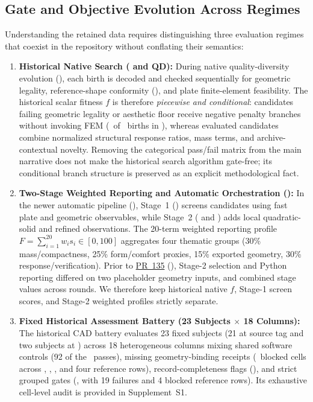 \subsection{Gate and Objective Evolution Across Regimes}
\label{subsec:gate-evolution}
Understanding the retained data requires distinguishing three evaluation regimes that coexist in the repository without conflating their semantics:
\begin{enumerate}
  \item \textbf{Historical Native Search ( and  QD):} During native quality-diversity evolution (), each birth is decoded and checked sequentially for geometric legality, reference-shape conformity (), and plate finite-element feasibility. The historical scalar fitness $f$ is therefore \emph{piecewise and conditional}: candidates failing geometric legality or aesthetic floor receive negative penalty branches without invoking FEM (\FemNotEvaluated\ of \BirthCount\ births in ), whereas evaluated candidates combine normalized structural response ratios, mass terms, and archive-contextual novelty. Removing the categorical pass/fail matrix from the main narrative does not make the historical search algorithm gate-free; its conditional branch structure is preserved as an explicit methodological fact.
  \item \textbf{Two-Stage Weighted Reporting and Automatic Orchestration ():} In the newer automatic pipeline (), Stage~1 () screens candidates using fast plate and geometric observables, while Stage~2 ( and ) adds local quadratic-solid and refined observations. The 20-term weighted reporting profile $F = \sum_{i=1}^{20} w_i s_i \in [0,100]$ aggregates four thematic groups (30\% mass/compactness, 25\% form/comfort proxies, 15\% exported geometry, 30\% response/verification). Prior to \href{https://github.com/neverhuman/jarambit/pull/135}{PR~135} (), Stage-2 selection and Python reporting differed on two placeholder geometry inputs, and  combined stage values across rounds. We therefore keep historical native $f$, Stage-1 screen scores, and Stage-2 weighted profiles strictly separate.
  \item \textbf{Fixed Historical Assessment Battery (23 Subjects $\times$ 18 Columns):} The historical CAD battery evaluates 23 fixed subjects (21 at source tag  and two  subjects at ) across 18 heterogeneous columns mixing shared software controls (92 of the \BatteryPass\ passes), missing geometry-binding receipts (\BatteryBlocked\ blocked cells across , , , and four reference rows), record-completeness flags (), and strict grouped gates (, with 19 failures and 4 blocked reference rows). Its exhaustive cell-level audit is provided in Supplement~S1.
\end{enumerate}

